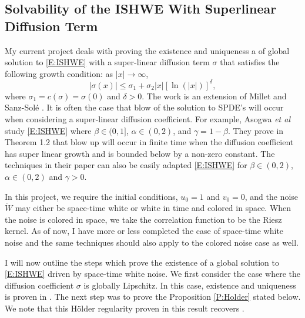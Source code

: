 \documentclass[a4paper,11pt]{article}
\numberwithin{equation}{section}
\theoremstyle{plain}
\theoremstyle{definition}
\numberwithin{NQ}{section}
\numberwithin{LQ}{section}
\numberwithin{ZQ}{section}
\begin{document}
\subsection{Solvability of the ISHWE With Superlinear Diffusion Term}
\label{S:GlobalSupLinWhite}
My current project deals with proving the existence and uniqueness a of global solution to \eqref{E:ISHWE} with a super-linear diffusion term $\sigma$ that satisfies the following growth condition: as $|x| \to \infty$,
\begin{equation}
\label{C:SigSupLin}
|\sigma(x)| \le \sigma_1 + \sigma_2|x|[\ln(|x|)]^{\delta},
\end{equation}
where $\sigma_1 = c(\sigma) = \sigma(0)$ and $\delta >0$. The work is an extension of Millet and Sanz-Sol\'e \cite{SoleMillet2021}. It is often the case that blow of the solution to SPDE's will occur when considering a super-linear diffusion coefficient. For example, Asogwa {\it et al} \cite{AMN19} study \eqref{E:ISHWE} where $\beta \in (0,1]$, $\alpha \in (0,2)$, and $\gamma = 1- \beta$. They prove in Theorem 1.2 that blow up will occur in finite time when the diffusion coefficient has super linear growth and is bounded below by a non-zero constant. The techniques in their paper can also be easily adapted \eqref{E:ISHWE} for $\beta \in (0,2)$, $\alpha \in (0,2)$ and $\gamma >0$.

In this project, we require the initial conditions, $u_0=1$ and $v_0=0$, and the noise $\dot{W}$ may either be space-time white or white in time and colored in space. When the noise is colored in space, we take the correlation function to be the Riesz kernel. As of now, I have more or less completed the case of space-time white noise and the same techniques should also apply to the colored noise case as well. 

I will now outline the steps which prove the existence of a global solution to \eqref{E:ISHWE} driven by space-time white noise. We first consider the case where the diffusion coefficient $\sigma$ is globally Lipschitz. In this case, existence and uniqueness is proven in \cite[Theorem 3.1]{CHN19}. The next step was to prove the Proposition \ref{P:Holder} stated below. We note that this H\"older regularity proven in this result recovers \cite[Theorem 1.9]{FN2016}.
\end{document}
